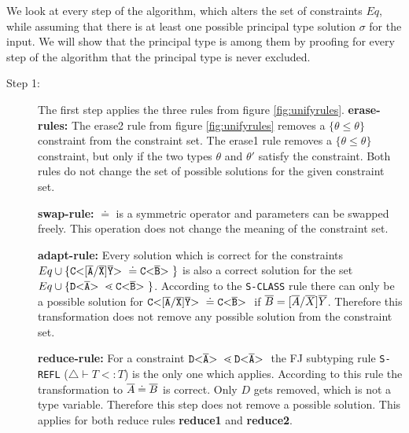 \documentclass[acmsmall,screen,review]{acmart}
\begin{document}
We look at every step of the algorithm, which alters the set of constraints $Eq$,
while assuming that there is at least one possible principal type solution $\sigma$ for the input.
We will show that the principal type is among them by proofing for every step of the algorithm that the principal type is never excluded.


\begin{description}
\item[Step 1:]
The first step applies the three rules from figure \ref{fig:unifyrules}.
\textbf{erase-rules:} The erase2 rule from figure \ref{fig:unifyrules} removes a
$\{\theta \leq \theta\}$ constraint from the constraint set.
The erase1 rule removes a $\{\theta \leq \theta\}$ constraint,
but only if the two types $\theta$ and $\theta'$ satisfy the constraint.
Both rules do not change the set of possible solutions for the given constraint set.

\textbf{swap-rule:} $\doteq$ is a symmetric operator and parameters can be swapped freely.
This operation does not change the meaning of the constraint set.

\textbf{adapt-rule:} Every solution which is correct for the constraints
$Eq \cup \{  \mathtt{C {\tt <} [\overline{A}/\overline{X}]\overline{Y} {\tt >} \ } \doteq \mathtt{C {\tt <} \overline{B} {\tt >} \ } \}$ is also
a correct solution for the set $Eq \cup \{  \mathtt{D {\tt <} \overline{A} {\tt >} \ } \lessdot \mathtt{C {\tt <} \overline{B} {\tt >} \ } \}$.
According to the \texttt{S-CLASS} rule there can only be a possible solution for 
$\mathtt{C {\tt <} [\overline{A}/\overline{X}]\overline{Y} {\tt >} \ } \doteq \mathtt{C {\tt <} \overline{B} {\tt >} \ }$
if $\overline{B} = [\overline{A}/\overline{X}]\overline{Y}$.
Therefore this transformation does not remove any possible solution from the constraint set.

\textbf{reduce-rule:}
For a constraint $\mathtt{D {\tt <} \overline{A} {\tt >} \ } \lessdot \mathtt{D {\tt <} \overline{A} {\tt >} \ }$ the FJ subtyping rule \texttt{S-REFL} ($\triangle \vdash T <: T$) is the only one which applies.
According to this rule the transformation to $\overline{A} \doteq \overline{B}$ is correct.
Only $D$ gets removed, which is not a type variable.
Therefore this step does not remove a possible solution.
This applies for both reduce rules \textbf{reduce1} and \textbf{reduce2}.


\end{description}
\end{document}
